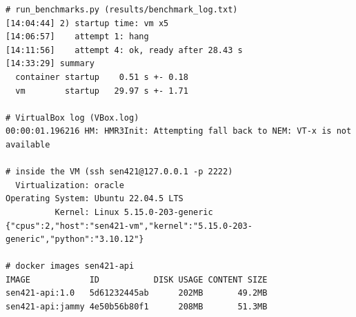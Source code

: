 \documentclass[conference,a4paper]{IEEEtran}
\begin{document}
\begin{lstlisting}[language={}, numbers=none, basicstyle=\ttfamily\scriptsize, caption={Command-line output (excerpts; column spacing condensed to fit)}, label={lst:cli}]
# run_benchmarks.py (results/benchmark_log.txt)
[14:04:44] 2) startup time: vm x5
[14:06:57]    attempt 1: hang
[14:11:56]    attempt 4: ok, ready after 28.43 s
[14:33:29] summary
  container startup    0.51 s +- 0.18
  vm        startup   29.97 s +- 1.71

# VirtualBox log (VBox.log)
00:00:01.196216 HM: HMR3Init: Attempting fall back to NEM: VT-x is not available

# inside the VM (ssh sen421@127.0.0.1 -p 2222)
  Virtualization: oracle
Operating System: Ubuntu 22.04.5 LTS
          Kernel: Linux 5.15.0-203-generic
{"cpus":2,"host":"sen421-vm","kernel":"5.15.0-203-generic","python":"3.10.12"}

# docker images sen421-api
IMAGE            ID           DISK USAGE CONTENT SIZE
sen421-api:1.0   5d61232445ab      202MB       49.2MB
sen421-api:jammy 4e50b56b80f1      208MB       51.3MB
\end{lstlisting}
\end{document}
